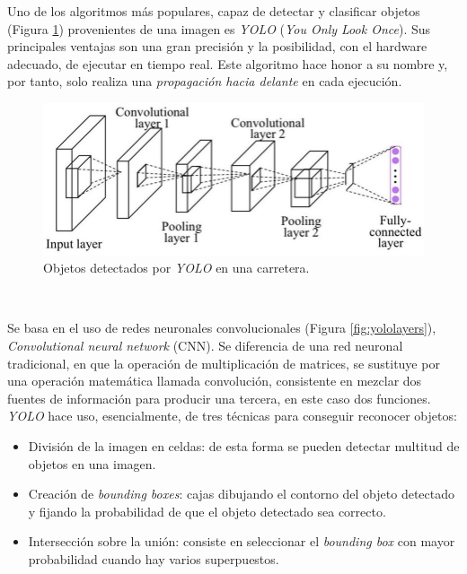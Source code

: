 Uno de los algoritmos más populares, capaz de detectar y clasificar objetos (Figura \ref{fig:yolo}) provenientes de una imagen es \textit{YOLO} (\textit{You Only Look Once})\cite{yolov3}. Sus principales ventajas son una gran precisión y la posibilidad, con el hardware adecuado, de ejecutar en tiempo real. Este algoritmo hace honor a su nombre y, por tanto, solo realiza una \textit{propagación hacia delante} en cada ejecución.\\

\begin{figure} [h!]
	\begin{center}
		\includegraphics[width=12cm]{figs/yolo}
	\end{center}
	\caption{Objetos detectados por \textit{YOLO} en una carretera.}
	\label{fig:yolo}
\end{figure}\

Se basa en el uso de redes neuronales convolucionales (Figura \ref{fig:yololayers}), \textit{Convolutional neural network} (CNN). Se diferencia de una red neuronal tradicional, en que la operación de multiplicación de matrices, se sustituye por una operación matemática llamada convolución, consistente en mezclar dos fuentes de información para producir una tercera, en este caso dos funciones.\\

\textit{YOLO} hace uso, esencialmente, de tres técnicas para conseguir reconocer objetos:\\
\begin{itemize}
	\item División de la imagen en celdas: de esta forma se pueden detectar multitud de objetos en una imagen.
	\item Creación de \textit{bounding boxes}: cajas dibujando el contorno del objeto detectado y fijando la probabilidad de que el objeto detectado sea correcto.
	\item Intersección sobre la unión: consiste en seleccionar el \textit{bounding box} con mayor probabilidad cuando hay varios superpuestos.
\end{itemize}\

